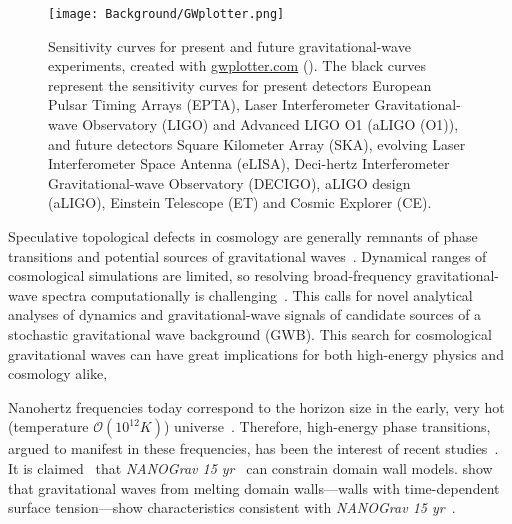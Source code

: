 \begin{figure}[hb]
    \centering
    \texttt{[image: Background/GWplotter.png]}
    \caption{Sensitivity curves for present and future gravitational-wave experiments, created with \href{http://www.sr.bham.ac.uk/~cplb/GWplotter/}{\textsf{gwplotter.com}} (\thismonthyear). The black curves represent the sensitivity curves for present detectors European Pulsar Timing Arrays (EPTA), Laser Interferometer Gravitational-wave Observatory (LIGO) and Advanced LIGO O1 (aLIGO (O1)), and future detectors Square Kilometer Array (SKA), evolving Laser Interferometer Space Antenna (eLISA), Deci-hertz Interferometer Gravitational-wave Observatory (DECIGO), aLIGO design (aLIGO), Einstein Telescope (ET) and Cosmic Explorer (CE).}
    \label{fig:intro:GWplotter}
\end{figure}


Speculative topological defects in cosmology are generally remnants of phase transitions and potential sources of gravitational waves~\citep{christiansenGravitationalWavesDark2024,saikawaReviewGravitationalWaves2017}. Dynamical ranges of cosmological simulations are limited, so resolving broad-frequency gravitational-wave spectra computationally is challenging~\citep{saikawaReviewGravitationalWaves2017}. \hypertarget{sentence1}{This calls for novel analytical analyses of dynamics and gravitational-wave signals} of candidate sources of a stochastic gravitational wave background (GWB). This search for cosmological gravitational waves can have great implications for both high-energy physics and cosmology alike,  

Nanohertz frequencies today correspond to the horizon size in the early, very hot (temperature $\mathscr{O}(10^{12}\unit{K})$) universe~\citep{christiansenGravitationalWavesDark2024}. Therefore, high-energy phase transitions, argued to manifest in these frequencies, has been the interest of recent studies~\citep{babichevNANOGravSpectralIndex2023,saikawaReviewGravitationalWaves2017,liProbingHighTemperature2023,hiramatsuGravitationalWavesCollapsing2010}. It is claimed~\citep{afzalNANOGrav15Yr2023} that \textit{NANOGrav 15 yr}~\cite{agazieNANOGrav15Yr2023a} can constrain domain wall models.  show that gravitational waves from melting domain walls---walls with time-dependent surface tension---show characteristics consistent with \textit{NANOGrav 15 yr}~\cite{agazieNANOGrav15Yr2023a}.  



